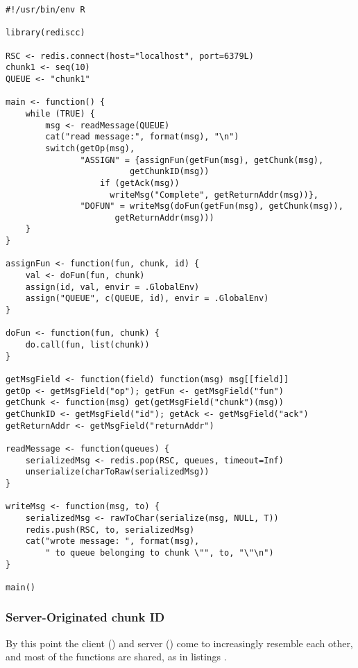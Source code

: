\hypertarget{lst:ro-ass-server}{%
\label{lst:ro-ass-server}}%
\begin{verbatim}
#!/usr/bin/env R

library(rediscc)

RSC <- redis.connect(host="localhost", port=6379L)
chunk1 <- seq(10)
QUEUE <- "chunk1"

main <- function() {
    while (TRUE) {
        msg <- readMessage(QUEUE)
        cat("read message:", format(msg), "\n")
        switch(getOp(msg),
               "ASSIGN" = {assignFun(getFun(msg), getChunk(msg),
                         getChunkID(msg))
                   if (getAck(msg))
                     writeMsg("Complete", getReturnAddr(msg))},
               "DOFUN" = writeMsg(doFun(getFun(msg), getChunk(msg)),
                      getReturnAddr(msg)))
    }
}

assignFun <- function(fun, chunk, id) {
    val <- doFun(fun, chunk)
    assign(id, val, envir = .GlobalEnv)
    assign("QUEUE", c(QUEUE, id), envir = .GlobalEnv)
}

doFun <- function(fun, chunk) {
    do.call(fun, list(chunk))
}

getMsgField <- function(field) function(msg) msg[[field]]
getOp <- getMsgField("op"); getFun <- getMsgField("fun")
getChunk <- function(msg) get(getMsgField("chunk")(msg))
getChunkID <- getMsgField("id"); getAck <- getMsgField("ack")
getReturnAddr <- getMsgField("returnAddr")

readMessage <- function(queues) {
    serializedMsg <- redis.pop(RSC, queues, timeout=Inf)
    unserialize(charToRaw(serializedMsg))
}

writeMsg <- function(msg, to) {
    serializedMsg <- rawToChar(serialize(msg, NULL, T))
    redis.push(RSC, to, serializedMsg)
    cat("wrote message: ", format(msg),
        " to queue belonging to chunk \"", to, "\"\n")
}

main()
\end{verbatim}

\hypertarget{server-originated-chunk-id}{%
\subsubsection{Server-Originated chunk
ID}\label{server-originated-chunk-id}}

By this point the client (\cite{lst:wo-ass-client}) and server
(\cite{lst:wo-ass-server}) come to increasingly resemble each other, and
most of the functions are shared, as in listings \cite{lst:wo-ass-chunk}
\cite{lst:wo-ass-shared}\cite{lst:wo-ass-messages}.

